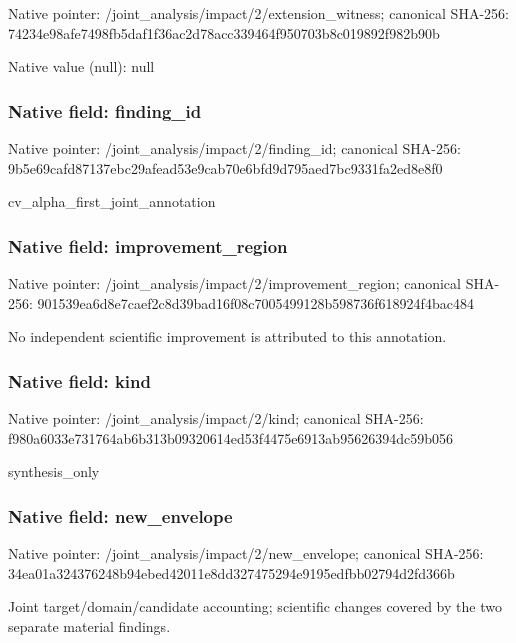 \documentclass[10pt,a4paper]{article}
\begin{document}
Native pointer: /joint\_analysis/impact/2\allowbreak{}/extension\_witness; canonical SHA-256: 74234e98afe7498fb5daf1f3\allowbreak{}6ac2d78acc339464f950703b\allowbreak{}8c019892f982b90b



Native value (null): null



\subsubsection{Native field: finding\_id}


Native pointer: /joint\_analysis/impact/2/finding\_id; canonical SHA-256: 9b5e69cafd87137ebc29afea\allowbreak{}d53e9cab70e6bfd9d795aed7\allowbreak{}bc9331fa2ed8e8f0


cv\_alpha\_first\_joint\_annotation


\subsubsection{Native field: improvement\_region}


Native pointer: /joint\_analysis/impact/2\allowbreak{}/improvement\_region; canonical SHA-256: 901539ea6d8e7caef2c8d39b\allowbreak{}ad16f08c7005499128b59873\allowbreak{}6f618924f4bac484


No independent scientific improvement is attributed to this annotation.


\subsubsection{Native field: kind}


Native pointer: /joint\_analysis/impact/2/kind; canonical SHA-256: f980a6033e731764ab6b313b\allowbreak{}09320614ed53f4475e6913ab\allowbreak{}95626394dc59b056


synthesis\_only


\subsubsection{Native field: new\_envelope}


Native pointer: /joint\_analysis/impact/2/new\_envelope; canonical SHA-256: 34ea01a324376248b94ebed4\allowbreak{}2011e8dd327475294e9195ed\allowbreak{}fbb02794d2fd366b


Joint target/domain/candidate accounting; scientific changes covered by the two separate material findings.
\end{document}
